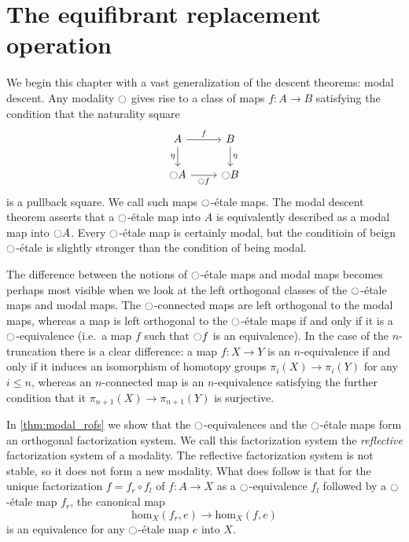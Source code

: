 \chapter{The equifibrant replacement operation}\label{chap:equifibrant}

We begin this chapter with a vast generalization of the descent theorems: modal descent.
Any modality ${\ocircle}$ gives rise to a class of maps $f:A\to B$ satisfying the condition that the naturality square
\begin{equation*}
\begin{tikzcd}
A \arrow[r,"f"] \arrow[d,swap,"\eta"] & B \arrow[d,"\eta"] \\
\modal A \arrow[r,swap,"\modal f"] & \modal B
\end{tikzcd}
\end{equation*}
is a pullback square. We call such maps ${\ocircle}$-\'etale maps. The modal descent theorem asserts that a ${\ocircle}$-\'etale map into $A$ is equivalently described as a modal map into ${\ocircle} A$. Every ${\ocircle}$-\'etale map is certainly modal, but the conditioin of beign ${\ocircle}$-\'etale is slightly stronger than the condition of being modal. 

The difference between the notions of ${\ocircle}$-\'etale maps and modal maps becomes perhaps most visible when we look at the left orthogonal classes of the ${\ocircle}$-\'etale maps and modal maps. The ${\ocircle}$-connected maps are left orthogonal to the modal maps, whereas a map is left orthogonal to the ${\ocircle}$-\'etale maps if and only if it is a ${\ocircle}$-equivalence (i.e.~a map $f$ such that ${\ocircle} f$ is an equivalence). In the case of the $n$-truncation there is a clear difference: a map $f:X\to Y$ is an $n$-equivalence if and only if it induces an isomorphism of homotopy groups $\pi_i(X)\to \pi_i(Y)$ for any $i\leq n$, whereas an $n$-connected map is an $n$-equivalence satisfying the further condition that it $\pi_{n+1}(X)\to\pi_{n+1}(Y)$ is surjective.

In \cref{thm:modal_rofs} we show that the ${\ocircle}$-equivalences and the ${\ocircle}$-\'etale maps form an orthogonal factorization system. We call this factorization system the \emph{reflective} factorization system of a modality. The reflective factorization system is not stable, so it does not form a new modality. What does follow is that for the unique factorization $f=f_r\circ f_l$ of $f:A\to X$ as a ${\ocircle}$-equivalence $f_l$ followed by a ${\ocircle}$-\'etale map $f_r$, the canonical map
\begin{equation*}
\mathrm{hom}_X(f_r,e)\to\mathrm{hom}_X(f,e)
\end{equation*}
is an equivalence for any ${\ocircle}$-\'etale map $e$ into $X$. 

